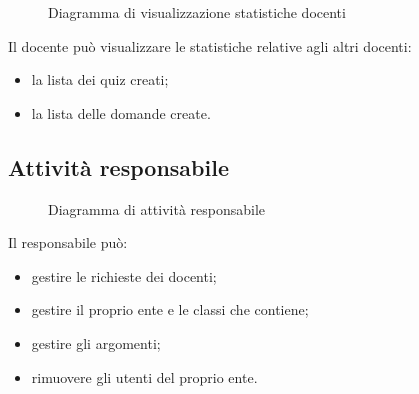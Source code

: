 \documentclass[a4paper, titlepage]{article}
\begin{document}
\newpage
{}
\begin{figure}[H]
	\centering
	\noindent{}
	\caption{Diagramma di visualizzazione statistiche docenti}
\end{figure}
Il docente può visualizzare le statistiche relative agli altri docenti:
\begin{itemize} 
	\item la lista dei quiz creati;
	\item la lista delle domande create.
\end{itemize}

\newpage
\subsection{Attività responsabile}
\begin{figure}[H]
	\centering
	\noindent{}
	\caption{Diagramma di attività responsabile}
\end{figure}
Il responsabile può:
\begin{itemize}
	\item gestire le richieste dei docenti;
	\item gestire il proprio ente e le classi che contiene;
	\item gestire gli argomenti;
	\item rimuovere gli utenti del proprio ente. 
\end{itemize}
\end{document}
